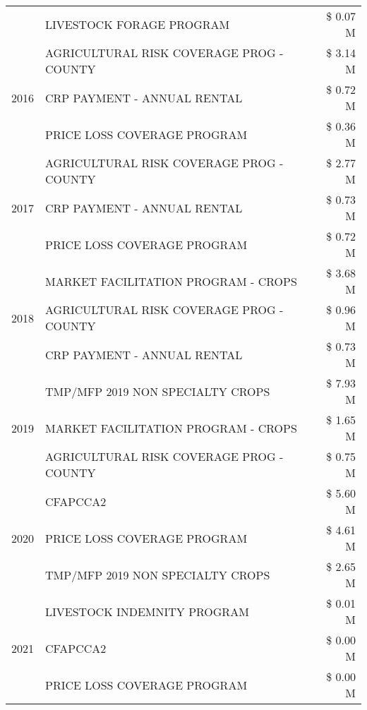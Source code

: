 \begin{tabular}{llr}
 & LIVESTOCK FORAGE PROGRAM & \$ 0.07 M \\
\cline{1-3}
\multirow[t]{3}{*}{2016} & AGRICULTURAL RISK COVERAGE PROG - COUNTY & \$ 3.14 M \\
 & CRP PAYMENT - ANNUAL RENTAL & \$ 0.72 M \\
 & PRICE LOSS COVERAGE PROGRAM & \$ 0.36 M \\
\cline{1-3}
\multirow[t]{3}{*}{2017} & AGRICULTURAL RISK COVERAGE PROG - COUNTY & \$ 2.77 M \\
 & CRP PAYMENT - ANNUAL RENTAL & \$ 0.73 M \\
 & PRICE LOSS COVERAGE PROGRAM & \$ 0.72 M \\
\cline{1-3}
\multirow[t]{3}{*}{2018} & MARKET FACILITATION PROGRAM - CROPS & \$ 3.68 M \\
 & AGRICULTURAL RISK COVERAGE PROG - COUNTY & \$ 0.96 M \\
 & CRP PAYMENT - ANNUAL RENTAL & \$ 0.73 M \\
\cline{1-3}
\multirow[t]{3}{*}{2019} & TMP/MFP 2019 NON SPECIALTY CROPS & \$ 7.93 M \\
 & MARKET FACILITATION PROGRAM - CROPS & \$ 1.65 M \\
 & AGRICULTURAL RISK COVERAGE PROG - COUNTY & \$ 0.75 M \\
\cline{1-3}
\multirow[t]{3}{*}{2020} & CFAPCCA2 & \$ 5.60 M \\
 & PRICE LOSS COVERAGE PROGRAM & \$ 4.61 M \\
 & TMP/MFP 2019 NON SPECIALTY CROPS & \$ 2.65 M \\
\cline{1-3}
\multirow[t]{3}{*}{2021} & LIVESTOCK INDEMNITY PROGRAM & \$ 0.01 M \\
 & CFAPCCA2 & \$ 0.00 M \\
 & PRICE LOSS COVERAGE PROGRAM & \$ 0.00 M \\
\cline{1-3}
\bottomrule
\end{tabular}
